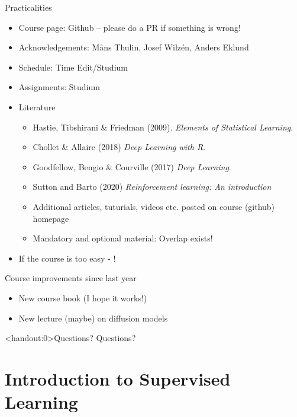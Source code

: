 \documentclass[10pt]{beamer}
\begin{document}
\begin{frame}{Practicalities}

\begin{itemize}
\item Course page: Github -- please do a PR if something is wrong!\pause
\item Acknowledgements: M{\aa}ns Thulin, Josef Wilzén, Anders Eklund\pause
\item Schedule: Time Edit/Studium
\item Assignments: Studium\pause
\item Literature
\begin{itemize}
\item Hastie, Tibshirani \& Friedman (2009). \emph{Elements of Statistical Learning}.
\item Chollet \& Allaire (2018) \emph{Deep Learning with R}.
\item Goodfellow, Bengio \& Courville (2017) \emph{Deep Learning}.
\item Sutton and Barto (2020) \emph{Reinforcement learning: An introduction}
\item Additional articles, tuturials, videos etc. posted on course (github) homepage
\item Mandatory and optional material: Overlap exists!
\end{itemize}
\pause
\item If the course is too easy - !
\end{itemize}

\end{frame}



\begin{frame}{Course improvements since last year}

\begin{itemize}
\item New course book (I hope it works!)
\item New lecture (maybe) on diffusion models
\end{itemize}

\end{frame}

\begin{frame}<handout:0>{Questions?}
Questions?
\end{frame}


\section{Introduction to Supervised Learning}
\frame{\sectionpage}
\end{document}
